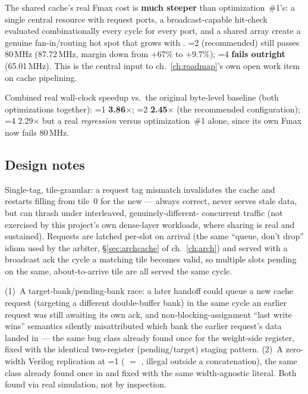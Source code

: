 \begin{fnwarn}
The shared cache's real Fmax cost is \textbf{much steeper} than
optimization~\#1's: a single central resource with 
request ports, a broadcast-capable hit-check evaluated combinationally
every cycle for every port, and a shared  array create
a genuine fan-in/routing hot spot that grows with .
=2 (recommended) still passes 80\,MHz (87.72\,MHz, margin
down from $+$67\% to $+$9.7\%); =4 \textbf{fails outright}
(65.01\,MHz). This is the central input to ch.~\ref{ch:roadmap}'s own
open work item on cache pipelining.
\end{fnwarn}

Combined real wall-clock speedup vs.\ the original byte-level baseline
(both optimizations together): =1 \textbf{3.86$\times$};
=2 \textbf{2.45$\times$} (the recommended configuration);
=4 2.29$\times$ but a real \emph{regression} versus
optimization~\#1 alone, since its own Fmax now fails 80\,MHz.

\subsection{Design notes}
Single-tag, tile-granular: a request tag mismatch invalidates the cache
and restarts filling from tile~0 for the new  --- always
correct, never serves stale data, but can thrash under interleaved,
genuinely-different- concurrent traffic (not exercised by
this project's own dense-layer workloads, where sharing is real and
sustained). Requests are latched per-slot on arrival (the same
``queue, don't drop'' idiom used by the arbiter, \S\ref{sec:archcache}
of ch.~\ref{ch:arch}) and served with a broadcast ack the cycle a
matching tile becomes valid, so multiple slots pending on the same,
about-to-arrive tile are all served the same cycle.

\begin{fnnote}
(1)~A target-bank/pending-bank race: a later handoff could queue a new
cache request (targeting a different double-buffer bank) in the same
cycle an earlier request was still awaiting its own ack, and
non-blocking-assignment ``last write wins'' semantics silently
misattributed which bank the earlier request's data landed in --- the
same bug class already found once for the weight-side
 register, fixed with the identical two-register
(pending/target) staging pattern. (2)~A zero-width Verilog replication
at =1 ( $=$ ,
illegal outside a concatenation), the same class already found once in
 and fixed with the same width-agnostic
 literal. Both found via real simulation, not by inspection.
\end{fnnote}

